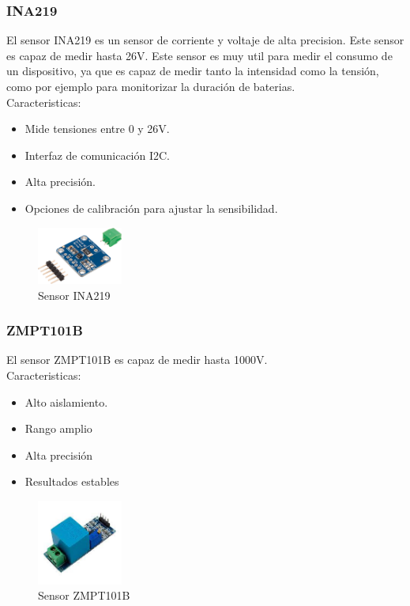 \begin{titlepage}
\subsubsection{INA219}
El sensor INA219\cite{ref5} es un sensor de corriente y voltaje de alta precision. Este sensor es capaz de medir hasta 26V. Este sensor es muy util para medir el consumo de un dispositivo, ya que es capaz de medir tanto la intensidad como la tensión, como por ejemplo para monitorizar la duración de baterias.\\

Caracteristicas:
\begin{itemize}
	\item Mide tensiones entre 0 y 26V.
	\item Interfaz de comunicación I2C.
	\item Alta precisión.
	\item Opciones de calibración para ajustar la sensibilidad.
\end{itemize}
\begin{figure}[h!]
	\centering
	\includegraphics[width=0.25\textwidth]{imagenes/ina219.png}
	\caption{Sensor INA219\cite{ina219_img}}
\end{figure}

\subsubsection{ZMPT101B}
El sensor ZMPT101B\cite{ref6} es capaz de medir hasta 1000V. \\

Caracteristicas:
\begin{itemize}
	\item Alto aislamiento.
	\item Rango amplio
	\item Alta precisión
	\item Resultados estables
\end{itemize}

\begin{figure}[h!]
	\centering
	\includegraphics[width=0.25\textwidth]{imagenes/zmpt101b.jpeg}
	\caption{Sensor ZMPT101B\cite{zmpt101b_img}}
\end{figure}



\end{titlepage}
